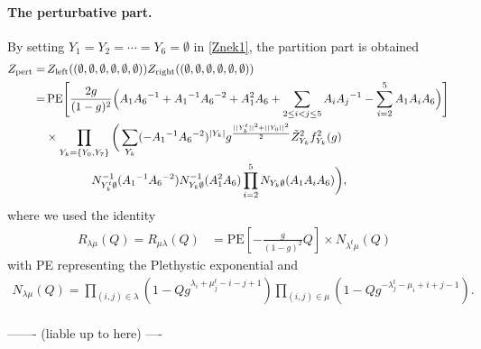 \documentclass[11pt,a4paper]{article}
\newcommand{\nn}{\nonumber}
\begin{document}
\paragraph{The perturbative part.}
By setting $Y_1=Y_2=\cdots = Y_6 = \emptyset$ in  \eqref{Znek1}, the partition part is obtained 
\begin{align}
Z_{\rm pert} 
=& \,
Z_{\text{left}}( (\emptyset,\emptyset,\emptyset,\emptyset,\emptyset,\emptyset ) )
Z_{\text{right}}( (\emptyset,\emptyset,\emptyset,\emptyset,\emptyset,\emptyset ) )
\cr
=&\, 
\text{PE} \Biggl[ 
\frac{2g}{(1-g)^2} 
\Bigl( A_1 A_6{}^{-1} 
+ A_1{}^{-1} A_6{}^{-2} + A_1^2  A_6 
+ \sum_{2 \le i <  j \le 5} A_i A_j{}^{-1}
- \sum_{i=2}^5 A_1 A_i  A_6
\Bigr)
\Biggr]
\cr 
& 
\times \prod_{Y_k=\{Y_0, Y_7\}}\bigg(\sum_{Y_k} ( - A_1{}^{-1} A_6{}^{-2})^{|Y_k|} 
g^{\frac{||Y_k^t||^2+||Y_0||^2}{2}} \tilde{Z}_{Y_k}^2 f_{Y_k}^2(g)
\cr 
& \qquad \qquad
N_{Y_k^t \emptyset }^{-1} (A_1{}^{-1} A_6{}^{-2})
 N^{-1}_{Y_k \emptyset } (A_1^2  A_6)\prod_{i=2}^5 N_{Y_k \emptyset } (A_1 A_i  A_6)\bigg) ,
\end{align}
where we used the identity
\begin{align}
R_{\lambda \mu} (Q)=R_{ \mu\lambda} (Q)
&= \text{PE} \left[ - \frac{g}{(1-g)^2} Q \right]
\times N_{\lambda^t \mu} (Q)
\end{align}
with PE representing the Plethystic exponential
 and 
\begin{align}
N_{\lambda \mu} (Q) 
= \prod_{(i,j) \in \lambda} \left( 1 - Q g^{\lambda_i + \mu_j^t -i-j+1} \right)
\prod_{(i,j) \in \mu} \left( 1 - Q g^{-\lambda^t_j - \mu_i + i + j - 1} \right).
\end{align}
 \\
{\color{red}------- (liable up to here) ----}\\
\end{document}
